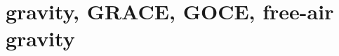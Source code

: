 

















































\section{gravity, GRACE, GOCE, free-air gravity}

